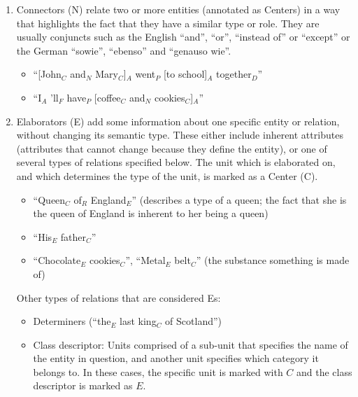 \documentclass[11pt]{article}
\newcommand{\nss}[1]{}
\begin{document}
\begin{enumerate}

\item
 {\sc Connectors} (N) relate two or more entities (annotated as Centers) in a way that 
 highlights the fact that they have a similar type or role.
 They are usually conjuncts such as the English ``and'', ``or'', ``instead of'' or ``except'' or the German ``sowie'', ``ebenso'' and ``genauso wie''.

  \begin{itemize}
  \item
    ``[John$_C$ and$_N$ Mary$_C$]$_A$ went$_P$ [to school]$_A$ together$_D$''
  \item
    ``I$_A$ 'll$_F$ have$_P$ [coffee$_C$ and$_N$ cookies$_C$]$_A$'' 
  \end{itemize}
  
\item
  {\sc Elaborators} (E) add some information about one specific entity or relation, without changing its semantic type. %
  These either include inherent attributes (attributes that cannot change 
  because they define the entity), or one of several types of relations specified 
  below. The unit which is elaborated on, and which determines the type of the 
  unit, is marked as a {\sc Center} (C).
  
  \begin{itemize}
    \item
      ``Queen$_C$ of$_R$ England$_E$'' (describes a type of a queen; the fact that she is the queen of England is inherent to her being a queen)
	\item
	  ``His$_E$ father$_C$''
	\item
      ``Chocolate$_E$ cookies$_C$'', ``Metal$_E$ belt$_C$'' (the substance something is made of)
  \end{itemize}
  
  Other types of relations that are considered Es:

  \begin{itemize}
  \item
    Determiners (``the$_E$ last king$_C$ of Scotland'')
  \item
    Class descriptor: Units comprised of a sub-unit that specifies the name of the entity in question,
    and another unit specifies which category it belongs to.
		In these cases, the specific unit is marked with $C$ and the class descriptor is marked as $E$.
		

\end{itemize}
\end{enumerate}
\end{document}
